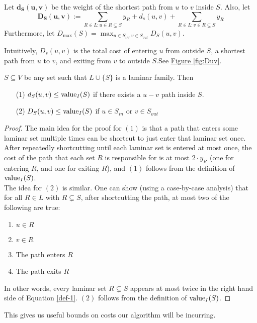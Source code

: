 \begin{definition} Let $\bm{d_S(u,v)}$ be the weight of the shortest path from $u$ to $v$ inside $S$. Also, let \begin{equation}\bm{D_S(u,v)}:=\sum_{R\in L : u\in R\subsetneq S}y_R + d_s(u,v) + \sum_{R\in L : v\in R\subsetneq S}y_R\label{def-1}\end{equation}
	Furthermore, let $D_{\max}(S) = \max_{u \in S_{in}, v \in S_{out}}D_S(u,v)$.
\end{definition}

Intuitively, $D_s(u,v)$ is the total cost of entering $u$ from outside $S$, a shortest path from $u$ to $v$, and exiting from $v$ to outside $S$.See \hyperref[fig:Duv]{Figure \ref{fig:Duv}}.\vspace{2mm}
\begin{lemma}\label{lemm:2:D-val} $S\subseteq V$ be any set such that $L\cup \{S\}$ is a laminar family. Then\begin{enumerate}
	\item[(1)] $d_S(u,v)\leq \textup{value}_I(S)$ if there exists a $u-v$ path inside $S$.
	\item[(2)] $D_S(u,v)\leq \textup{value}_I(S)$ if $u\in S_{in}$ or $v\in S_{out}$
	\end{enumerate}
\end{lemma}
\begin{proof}
	The main idea for the proof for $(1)$ is that a path that enters some laminar set multiple times can be shortcut to just enter that laminar set once. After repeatedly shortcutting until each laminar set is entered at most once, the cost of the path that each set $R$ is responsible for is at most $2\cdot y_R$ (one for entering $R$, and one for exiting $R$), and $(1)$ follows from the definition of $\textup{value}_I(S)$.\vspace{2mm}
	\\The idea for $(2)$ is similar. One can show (using a case-by-case analysis) that for all $R\in L$ with $R\subsetneq S$, after shortcutting the path, at most two of the following are true:
	\begin{enumerate}
		\item $u\in R$
		\item $v\in R$
		\item The path enters $R$
		\item The path exits $R$
	\end{enumerate}
	In other words, every laminar set $R\subsetneq S$ appears at most twice in the right hand side of Equation \ref{def-1}. $(2)$ follows from the definition of $\textup{value}_I(S)$.
\end{proof}\vspace{2mm}
This gives us useful bounds on costs our algorithm will be incurring.

